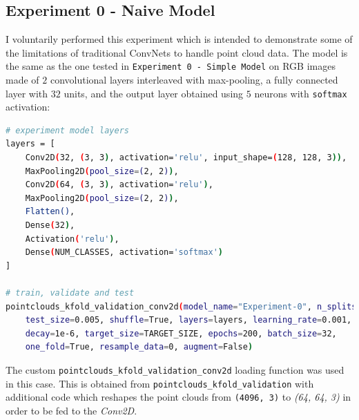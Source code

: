 \documentclass[11pt,a4paper]{article}
\begin{document}
\subsection{Experiment 0 - Naive Model}
I voluntarily performed this experiment which is intended to demonstrate some of the limitations of traditional ConvNets to handle point cloud data. The model is the same as the one tested in \texttt{Experiment 0 - Simple Model} on RGB images made of $2$ convolutional layers interleaved with max-pooling, a fully connected layer with $32$ units, and the output layer obtained using $5$ neurons with \texttt{softmax} activation:
\begin{lstlisting}[language=bash,frame=single]
# experiment model layers
layers = [
    Conv2D(32, (3, 3), activation='relu', input_shape=(128, 128, 3)),
    MaxPooling2D(pool_size=(2, 2)),
    Conv2D(64, (3, 3), activation='relu'),
    MaxPooling2D(pool_size=(2, 2)),
    Flatten(),
    Dense(32),
    Activation('relu'),
    Dense(NUM_CLASSES, activation='softmax')
]

# train, validate and test
pointclouds_kfold_validation_conv2d(model_name="Experiment-0", n_splits=6,
    test_size=0.005, shuffle=True, layers=layers, learning_rate=0.001,
    decay=1e-6, target_size=TARGET_SIZE, epochs=200, batch_size=32,
    one_fold=True, resample_data=0, augment=False)
\end{lstlisting}
The custom \texttt{pointclouds\_kfold\_validation\_conv2d} loading function was used in this case. This is obtained from \texttt{pointclouds\_kfold\_validation} with additional code which reshapes the point clouds from \texttt{(4096, 3)} to \textit{(64, 64, 3)} in order to be fed to the \textit{Conv2D}.
\end{document}
